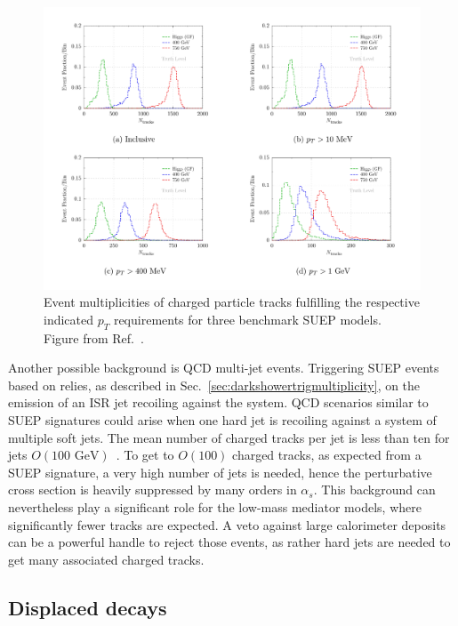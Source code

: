 \begin{figure}[tbp]
  \centering
  \includegraphics[width=.85\textwidth]{figures/DS_chargedParticleMultiplicities_SUEP.pdf}
  \caption{Event multiplicities of charged particle tracks fulfilling the respective indicated $p_{T}$ requirements for three benchmark SUEP models. Figure from Ref.~\cite{Knapen:2016hky}. }
  \label{fig:SUEPchargedParticleMultiplicities}
\end{figure}

Another possible background is QCD multi-jet events. Triggering SUEP events based on \MET relies, as described in Sec.~\ref{sec:darkshowertrigmultiplicity}, on the emission of an ISR jet recoiling against the system. QCD scenarios similar to SUEP signatures could arise when one hard jet is recoiling against a system of multiple soft jets. The mean number of charged tracks per jet is less than ten for jets $O(\text{100~GeV})$~\cite{Aad:2016oit}. To get to $O(100)$ charged tracks, as expected from a SUEP signature, a very high number of jets is needed, hence the perturbative cross section is heavily suppressed by many orders in $\alpha_{s}$. This background can nevertheless play a significant role for the low-mass mediator models, where significantly fewer tracks are expected. A veto against large calorimeter deposits can be a powerful handle to reject those events, as rather hard jets are needed to get many associated charged tracks.

\subsection{Displaced decays} %
\label{sec:darkshowerdisp}

